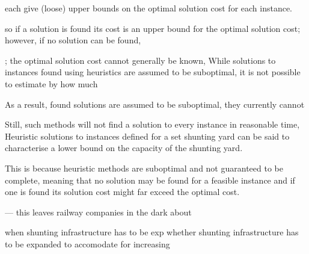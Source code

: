 \documentclass[english]{article}
\begin{document}
		
		
		each give (loose) upper bounds on the optimal solution cost for each instance.
		
		so if a solution is found its cost is an upper bound for the optimal solution cost; however, if no solution can be found, 
		
		; the optimal solution cost cannot generally be known, 
		While solutions to instances found using heuristics are assumed to be suboptimal, it is not possible to estimate by how much 
		
		As a result, found solutions are assumed to be suboptimal, they currently cannot 
		
		Still, such methods will not find a solution to every instance in reasonable time,
		Heuristic solutions to instances defined for a set shunting yard can be said to characterise a lower bound on the capacity of the shunting yard.  
		
		This is because heuristic methods are suboptimal and not guaranteed to be complete, meaning that no solution may be found for a feasible instance and if one is found its solution cost might far exceed the optimal cost.  
		
		
		---
			this leaves railway companies in the dark about 
		
		when shunting infrastructure has to be exp whether shunting infrastructure has to be expanded to accomodate for increasing     
		
\end{document}
